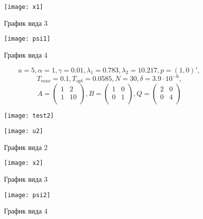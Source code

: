 \documentclass[11pt]{article}
\begin{document}
\begin{figure}\caption{График вида 3}
\centering
\texttt{[image: x1]}
\end{figure}

\begin{figure}\caption{График вида 4}
\centering
\texttt{[image: psi1]}
\end{figure}

\newpage
\[a = 5, \alpha = 1, \gamma = 0.01, \lambda_1 = 0.783, \lambda_2 = 10.217, p = (1,0)',\] 
\[T_{max} = 0.1, T_{opt} = 0.0585, N = 30, \delta = 3.9\cdot 10^{-6},\]
\[
A = \left(
\begin{array}{cc}
1 & 2\\
1 & 10\\
\end{array}
\right),
B = \left(
\begin{array}{cc}
1 & 0\\
0 & 1\\
\end{array}
\right),
Q = \left(
\begin{array}{cc}
2 & 0\\
0 & 4\\
\end{array}
\right)
\]

\begin{figure}[h!]
%
{\texttt{[image: test2]}}
\end{figure}

\begin{figure}\caption{График вида 2}
\centering
\texttt{[image: u2]}
\end{figure}

\begin{figure}\caption{График вида 3}
\centering
\texttt{[image: x2]}
\end{figure}

\begin{figure}\caption{График вида 4}
\centering
\texttt{[image: psi2]}
\end{figure}
\newpage
\end{document}
